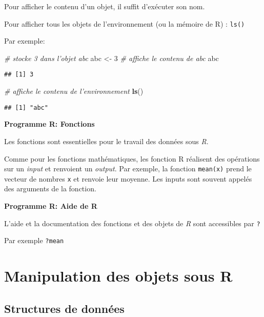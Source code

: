 \documentclass[]{book}
\newenvironment{Shaded}{\begin{snugshade}}{\end{snugshade}}
\newcommand{\CommentTok}[1]{\textcolor[rgb]{0.56,0.35,0.01}{\textit{#1}}}
\newcommand{\DecValTok}[1]{\textcolor[rgb]{0.00,0.00,0.81}{#1}}
\newcommand{\KeywordTok}[1]{\textcolor[rgb]{0.13,0.29,0.53}{\textbf{#1}}}
\newcommand{\NormalTok}[1]{#1}
\newcommand{\StringTok}[1]{\textcolor[rgb]{0.31,0.60,0.02}{#1}}
\begin{document}
Pour afficher le contenu d'un objet, il suffit d'exécuter son nom.

Pour afficher tous les objets de l'environnement (ou la mémoire de R) : \texttt{ls()}

Par exemple:

\begin{Shaded}
\begin{Highlighting}[]
\CommentTok{# stocke 3 dans l'objet abc}
\NormalTok{abc <-}\StringTok{ }\DecValTok{3}
\CommentTok{# affiche le contenu de abc}
\NormalTok{abc}
\end{Highlighting}
\end{Shaded}

\begin{verbatim}
## [1] 3
\end{verbatim}

\begin{Shaded}
\begin{Highlighting}[]
\CommentTok{# affiche le contenu de l'environnement}
\KeywordTok{ls}\NormalTok{()}
\end{Highlighting}
\end{Shaded}

\begin{verbatim}
## [1] "abc"
\end{verbatim}

\textbf{Programme R: Fonctions}

Les fonctions sont essentielles pour le travail des données sous \emph{R}.

Comme pour les fonctions mathématiques, les fonction R réalisent des opérations sur un \emph{input} et renvoient un \emph{output}.
Par exemple, la fonction \texttt{mean(x)} prend le vecteur de nombres \texttt{x} et renvoie leur moyenne.
Les inputs sont souvent appelés des arguments de la fonction.

\textbf{Programme R: Aide de R}

L'aide et la documentation des fonctions et des objets de \emph{R} sont accessibles par \texttt{?}

Par exemple \texttt{?mean}

\hypertarget{manipulation-des-objets-sous-r}{%
\chapter{Manipulation des objets sous R}\label{manipulation-des-objets-sous-r}}

\hypertarget{structures-de-donnees}{%
\section{Structures de données}\label{structures-de-donnees}}
\end{document}
